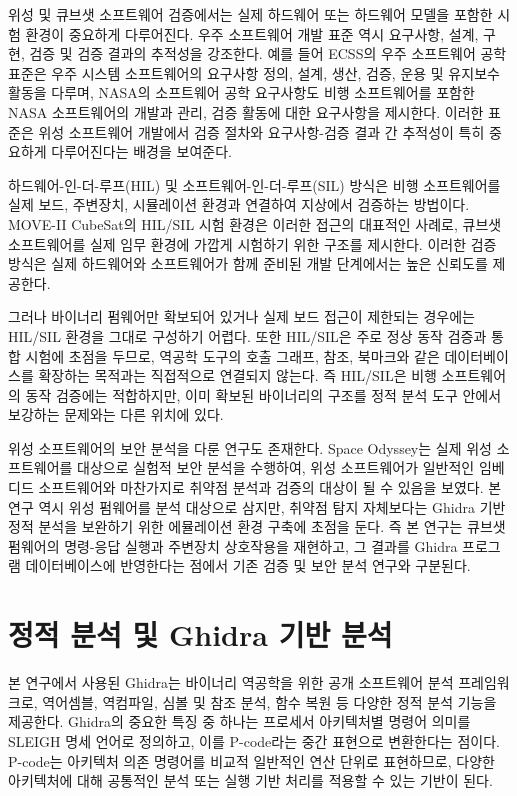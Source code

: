 \documentclass[master,korean,final]{kaist-ucs}
\begin{document}
위성 및 큐브샛 소프트웨어 검증에서는 실제 하드웨어 또는 하드웨어 모델을 포함한 시험 환경이 중요하게 다루어진다. 우주 소프트웨어 개발 표준 역시 요구사항, 설계, 구현, 검증 및 검증 결과의 추적성을 강조한다. 예를 들어 ECSS의 우주 소프트웨어 공학 표준은 우주 시스템 소프트웨어의 요구사항 정의, 설계, 생산, 검증, 운용 및 유지보수 활동을 다루며\cite{ECSSSoftware}, NASA의 소프트웨어 공학 요구사항도 비행 소프트웨어를 포함한 NASA 소프트웨어의 개발과 관리, 검증 활동에 대한 요구사항을 제시한다\cite{NASA7150}. 이러한 표준은 위성 소프트웨어 개발에서 검증 절차와 요구사항-검증 결과 간 추적성이 특히 중요하게 다루어진다는 배경을 보여준다.

하드웨어-인-더-루프(HIL) 및 소프트웨어-인-더-루프(SIL) 방식은 비행 소프트웨어를 실제 보드, 주변장치, 시뮬레이션 환경과 연결하여 지상에서 검증하는 방법이다. MOVE-II CubeSat의 HIL/SIL 시험 환경은 이러한 접근의 대표적인 사례로, 큐브샛 소프트웨어를 실제 임무 환경에 가깝게 시험하기 위한 구조를 제시한다\cite{MOVEII}. 이러한 검증 방식은 실제 하드웨어와 소프트웨어가 함께 준비된 개발 단계에서는 높은 신뢰도를 제공한다.

그러나 바이너리 펌웨어만 확보되어 있거나 실제 보드 접근이 제한되는 경우에는 HIL/SIL 환경을 그대로 구성하기 어렵다. 또한 HIL/SIL은 주로 정상 동작 검증과 통합 시험에 초점을 두므로, 역공학 도구의 호출 그래프, 참조, 북마크와 같은 데이터베이스를 확장하는 목적과는 직접적으로 연결되지 않는다. 즉 HIL/SIL은 비행 소프트웨어의 동작 검증에는 적합하지만, 이미 확보된 바이너리의 구조를 정적 분석 도구 안에서 보강하는 문제와는 다른 위치에 있다.

위성 소프트웨어의 보안 분석을 다룬 연구도 존재한다. Space Odyssey는 실제 위성 소프트웨어를 대상으로 실험적 보안 분석을 수행하여, 위성 소프트웨어가 일반적인 임베디드 소프트웨어와 마찬가지로 취약점 분석과 검증의 대상이 될 수 있음을 보였다\cite{SpaceOdyssey}. 본 연구 역시 위성 펌웨어를 분석 대상으로 삼지만, 취약점 탐지 자체보다는 Ghidra 기반 정적 분석을 보완하기 위한 에뮬레이션 환경 구축에 초점을 둔다. 즉 본 연구는 큐브샛 펌웨어의 명령-응답 실행과 주변장치 상호작용을 재현하고, 그 결과를 Ghidra 프로그램 데이터베이스에 반영한다는 점에서 기존 검증 및 보안 분석 연구와 구분된다.

\section{정적 분석 및 Ghidra 기반 분석}

본 연구에서 사용된 Ghidra는 바이너리 역공학을 위한 공개 소프트웨어 분석 프레임워크로, 역어셈블, 역컴파일, 심볼 및 참조 분석, 함수 복원 등 다양한 정적 분석 기능을 제공한다\cite{Ghidra}. Ghidra의 중요한 특징 중 하나는 프로세서 아키텍처별 명령어 의미를 SLEIGH 명세 언어로 정의하고, 이를 P-code라는 중간 표현으로 변환한다는 점이다\cite{SLEIGH}. P-code는 아키텍처 의존 명령어를 비교적 일반적인 연산 단위로 표현하므로, 다양한 아키텍처에 대해 공통적인 분석 또는 실행 기반 처리를 적용할 수 있는 기반이 된다.
\end{document}
